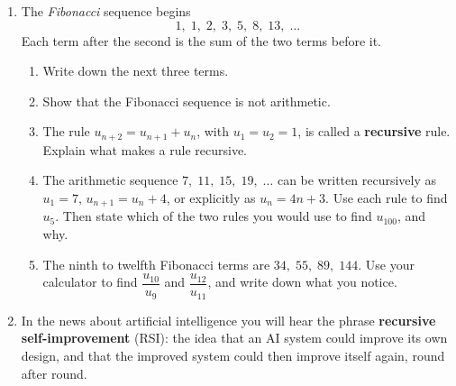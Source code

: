 \documentclass[12pt, twoside]{article}
\begin{document}
\begin{enumerate}[itemsep=0.15cm]

\newpage

\item[4.]

The \emph{Fibonacci} sequence begins
$$1,\; 1,\; 2,\; 3,\; 5,\; 8,\; 13,\; \ldots$$
Each term after the second is the sum of the two terms before it.

\begin{enumerate}[itemsep=0.1cm]
  \item Write down the next three terms.
  \item Show that the Fibonacci sequence is not arithmetic.
  \item The rule $u_{n+2} = u_{n+1} + u_{n}$, with $u_{1} = u_{2} = 1$, is
  called a \textbf{recursive} rule. Explain what makes a rule recursive.
  \item The arithmetic sequence $7,\; 11,\; 15,\; 19,\; \ldots$ can be
  written recursively as $u_{1} = 7$, $u_{n+1} = u_{n} + 4$, or explicitly
  as $u_{n} = 4n + 3$. Use each rule to find $u_{5}$. Then state which of
  the two rules you would use to find $u_{100}$, and why.
  \item The ninth to twelfth Fibonacci terms are $34,\; 55,\; 89,\; 144$.
  Use your calculator to find $\dfrac{u_{10}}{u_{9}}$ and
  $\dfrac{u_{12}}{u_{11}}$, and write down what you notice.
\end{enumerate}


\newpage

\item[5.]

In the news about artificial intelligence you will hear the phrase
\textbf{recursive self-improvement} (RSI): the idea that an AI system could
improve its own design, and that the improved system could then improve
itself again, round after round.


\end{enumerate}
\end{document}
